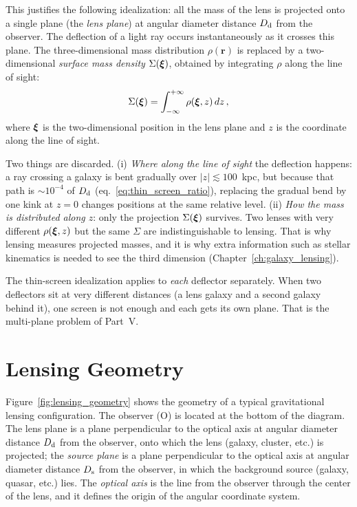 This justifies the following idealization: all the mass of the lens is
projected onto a single plane (the \emph{lens plane}) at angular
diameter distance $D_{\mathrm{d}}$ from the observer.  The deflection of a light
ray occurs instantaneously as it crosses this plane.  The three-dimensional
mass distribution $\rho(\mathbf{r})$ is replaced by a two-dimensional
\emph{surface mass density} $\Sigma(\boldsymbol{\xi})$, obtained by integrating
$\rho$ along the line of sight:
\begin{equation}
    \Sigma(\boldsymbol{\xi}) = \int_{-\infty}^{+\infty} \rho(\boldsymbol{\xi}, z)\, dz \,,
    \label{eq:surface_mass_density_def}
\end{equation}
where $\boldsymbol{\xi}$ is the two-dimensional position in the lens plane and $z$
is the coordinate along the line of sight.
\begin{annotation}
Two things are discarded. (i) \emph{Where along
the line of sight} the deflection happens: a ray crossing a galaxy is bent
gradually over $|z| \lesssim 100$~kpc, but because that path is
$\sim 10^{-4}$ of $D_{\mathrm{d}}$ (eq.~\ref{eq:thin_screen_ratio}), replacing the gradual
bend by one kink at $z = 0$ changes positions at the same relative level.
(ii) \emph{How the mass is distributed along $z$}: only the projection
$\Sigma(\boldsymbol{\xi})$ survives. Two lenses with very different $\rho(\boldsymbol{\xi}, z)$ but
the same $\Sigma$ are indistinguishable to lensing. That is why lensing
measures projected masses, and it is why extra information such as
stellar kinematics is needed to see the third dimension
(Chapter~\ref{ch:galaxy_lensing}).

The thin-screen idealization applies to \emph{each} deflector separately. When two
deflectors sit at very different distances (a lens galaxy and a second
galaxy behind it), one screen is not enough and each gets its own plane. That is
the multi-plane problem of Part~V.
\end{annotation}


\section{Lensing Geometry}
\label{sec:lensing_geometry}

Figure~\ref{fig:lensing_geometry} shows the geometry of a typical
gravitational lensing configuration.  The observer (O) is located at the
bottom of the diagram.  The lens plane is a plane perpendicular to the
optical axis at angular diameter distance $D_{\mathrm{d}}$ from the observer, onto
which the lens (galaxy, cluster, etc.) is projected; the \emph{source
plane} is a plane perpendicular to the optical axis at angular diameter
distance $D_{\mathrm{s}}$ from the observer, in which the background source (galaxy,
quasar, etc.) lies.  The \emph{optical axis} is the line from the
observer through the center of the lens, and it defines the origin of the
angular coordinate system.

